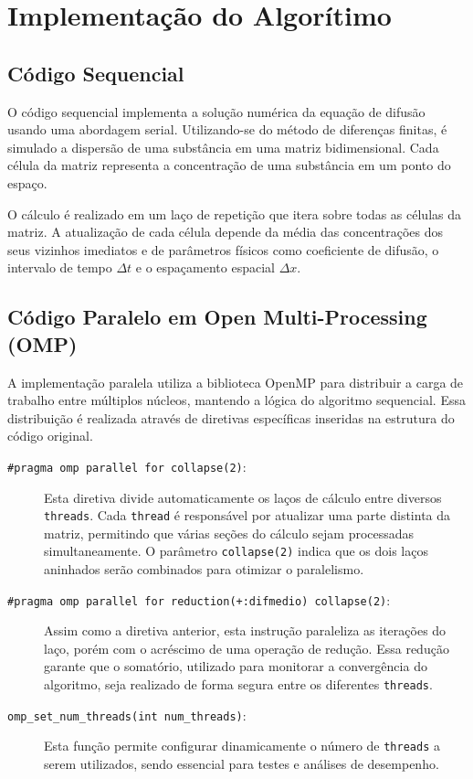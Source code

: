 \documentclass[12pt]{article}
\begin{document}
\section{Implementação do Algorítimo}

\subsection{Código Sequencial}

O código sequencial implementa a solução numérica da equação de difusão usando
uma abordagem serial. Utilizando-se do método de diferenças finitas, é simulado
a dispersão de uma substância em uma matriz bidimensional. Cada célula da
matriz representa a concentração de uma substância em um ponto do espaço.

O cálculo é realizado em um laço de repetição que itera sobre todas as células
da matriz. A atualização de cada célula depende da média das concentrações dos
seus vizinhos imediatos e de parâmetros físicos como coeficiente de difusão, o
intervalo de tempo $\Delta t$ e o espaçamento espacial $\Delta x$.

\subsection{Código Paralelo em Open Multi-Processing (OMP)}

A implementação paralela utiliza a biblioteca OpenMP para distribuir a carga de
trabalho entre múltiplos núcleos, mantendo a lógica do algoritmo sequencial.
Essa distribuição é realizada através de diretivas específicas inseridas na
estrutura do código original.

\begin{description}
  \item[\texttt{\#pragma omp parallel for collapse(2)}:]
        Esta diretiva divide automaticamente os laços de cálculo entre diversos \texttt{threads}. Cada \texttt{thread} é responsável por atualizar uma parte distinta da matriz, permitindo que várias seções do cálculo sejam processadas simultaneamente. O parâmetro \texttt{collapse(2)} indica que os dois laços aninhados serão combinados para otimizar o paralelismo.

  \item[\texttt{\#pragma omp parallel for reduction(+:difmedio) collapse(2)}:]
        Assim como a diretiva anterior, esta instrução paraleliza as iterações do laço, porém com o acréscimo de uma operação de redução. Essa redução garante que o somatório, utilizado para monitorar a convergência do algoritmo, seja realizado de forma segura entre os diferentes \texttt{threads}.

  \item[\texttt{omp\_set\_num\_threads(int num\_threads)}:]
        Esta função permite configurar dinamicamente o número de \texttt{threads} a serem utilizados, sendo essencial para testes e análises de desempenho.
\end{description}
\end{document}
